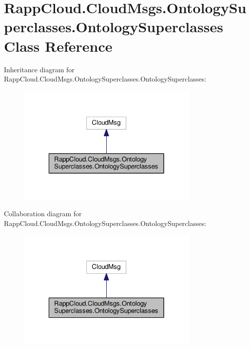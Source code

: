 \hypertarget{classRappCloud_1_1CloudMsgs_1_1OntologySuperclasses_1_1OntologySuperclasses}{\section{Rapp\-Cloud.\-Cloud\-Msgs.\-Ontology\-Superclasses.\-Ontology\-Superclasses Class Reference}
\label{classRappCloud_1_1CloudMsgs_1_1OntologySuperclasses_1_1OntologySuperclasses}
}


Inheritance diagram for Rapp\-Cloud.\-Cloud\-Msgs.\-Ontology\-Superclasses.\-Ontology\-Superclasses\-:
\nopagebreak
\begin{figure}[H]
\begin{center}
\leavevmode
\includegraphics[width=256pt]{classRappCloud_1_1CloudMsgs_1_1OntologySuperclasses_1_1OntologySuperclasses__inherit__graph}
\end{center}
\end{figure}


Collaboration diagram for Rapp\-Cloud.\-Cloud\-Msgs.\-Ontology\-Superclasses.\-Ontology\-Superclasses\-:
\nopagebreak
\begin{figure}[H]
\begin{center}
\leavevmode
\includegraphics[width=256pt]{classRappCloud_1_1CloudMsgs_1_1OntologySuperclasses_1_1OntologySuperclasses__coll__graph}
\end{center}
\end{figure}
